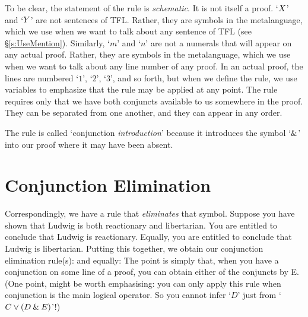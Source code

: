 To be clear, the statement of the rule is \emph{schematic}. It is not itself a proof.  `$X$' and `$Y$' are not sentences of TFL. Rather, they are symbols in the metalanguage, which we use when we want to talk about any sentence of TFL (see \S\ref{s:UseMention}). Similarly, `$m$' and `$n$' are not a numerals that will appear on any actual proof. Rather, they are symbols in the metalanguage, which we use when we want to talk about any line number of any proof. In an actual proof, the lines are numbered `$1$', `$2$', `$3$', and so forth, but when we define the rule, we use variables to emphasize that the rule may be applied at any point. The rule requires only that we have both conjuncts available to us somewhere in the proof. They can be separated from one another, and they can appear in any order. 

The rule is called `conjunction \emph{introduction}' because it introduces the symbol `$\mathbin{\&}$' into our proof where it may have been absent. 

\section{Conjunction Elimination}
Correspondingly, we have a rule that \emph{eliminates} that symbol.  Suppose you have shown that Ludwig is both reactionary and libertarian. You are entitled to conclude that Ludwig is reactionary. Equally, you are entitled to conclude that Ludwig is libertarian. Putting this together, we obtain our conjunction elimination rule(s):
and equally:
The point is simply that, when you have a conjunction on some line of a proof, you can obtain either of the conjuncts by {\eand}E. (One point, might be worth emphasising: you can only apply this rule when conjunction is the main logical operator. So you cannot infer `$D$' just from `$C \vee (D \mathbin{\&} E)$'!)

